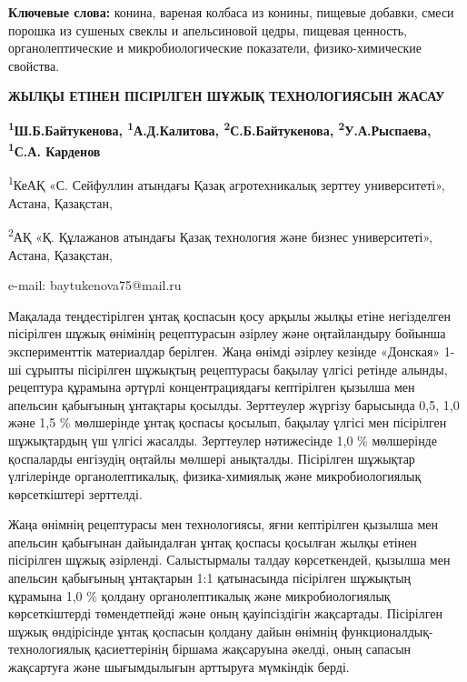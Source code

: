 {\bfseries Ключевые слова:} конина, вареная колбаса из конины, пищевые
добавки, смеси порошка из сушеных свеклы и апельсиновой цедры, пищевая
ценность, органолептические и микробиологические показатели,
физико-химические свойства.

\begin{articleheader}
{\bfseries ЖЫЛҚЫ ЕТІНЕН ПІСІРІЛГЕН ШҰЖЫҚ ТЕХНОЛОГИЯСЫН ЖАСАУ}

{\bfseries
\textsuperscript{1}Ш.Б.Байтукенова\textsuperscript{\envelope },
\textsuperscript{1}А.Д.Калитова,
\textsuperscript{2}С.Б.Байтукенова,
\textsuperscript{2}У.А.Рыспаева,
\textsuperscript{1}С.А. Карденов
}
\end{articleheader}

\begin{affiliation}
\textsuperscript{1}КеАҚ «С. Сейфуллин атындағы Қазақ агротехникалық зерттеу университеті», Астана, Қазақстан,

\textsuperscript{2}АҚ «Қ. Құлажанов атындағы Қазақ технология және бизнес университеті», Астана, Қазақстан,

e-mail: baytukenova75@mail.ru
\end{affiliation}

Мақалада теңдестірілген ұнтақ қоспасын қосу арқылы жылқы етіне
негізделген пісірілген шұжық өнімінің рецептурасын әзірлеу және
оңтайландыру бойынша эксперименттік материалдар берілген. Жаңа өнімді
әзірлеу кезінде «Донская» 1-ші сұрыпты пісірілген шұжықтың рецептурасы
бақылау үлгісі ретінде алынды, рецептура құрамына әртүрлі
концентрациядағы кептірілген қызылша мен апельсин қабығының ұнтақтары
қосылды. Зерттеулер жүргізу барысында 0,5, 1,0 және 1,5 \% мөлшерінде
ұнтақ қоспасы қосылып, бақылау үлгісі мен пісірілген шұжықтардың үш
үлгісі жасалды. Зерттеулер нәтижесінде 1,0 \% мөлшерінде қоспаларды
енгізудің оңтайлы мөлшері анықталды. Пісірілген шұжықтар үлгілерінде
органолептикалық, физика-химиялық және микробиологиялық көрсеткіштері
зерттелді.

Жаңа өнімнің рецептурасы мен технологиясы, яғни кептірілген қызылша мен
апельсин қабығынан дайындалған ұнтақ қоспасы қосылған жылқы етінен
пісірілген шұжық әзірленді. Салыстырмалы талдау көрсеткендей, қызылша
мен апельсин қабығының ұнтақтарын 1:1 қатынасында пісірілген шұжықтың
құрамына 1,0 \% қолдану органолептикалық және микробиологиялық
көрсеткіштерді төмендетпейді және оның қауіпсіздігін жақсартады.
Пісірілген шұжық өндірісінде ұнтақ қоспасын қолдану дайын өнімнің
функционалдық-технологиялық қасиеттерінің біршама жақсаруына әкелді,
оның сапасын жақсартуға және шығымдылығын арттыруға мүмкіндік берді.

